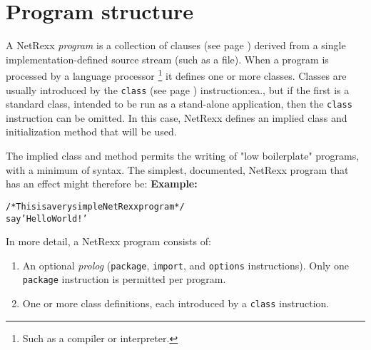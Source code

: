 \chapter{Program structure}\label{"id"}
 A NetRexx \emph{program} is a collection of
 clauses (see page \pageref{refclau})  derived from a single implementation-defined
source stream (such as a file).
When a program is processed by a language processor
\footnote{
Such as a compiler or interpreter.
}
it defines one or more classes.
Classes are usually introduced by the  \texttt{class} (see page \pageref{refclass}) 
instruction:ea., but if the first is a standard class, intended to be
run as a stand-alone application, then the \texttt{class} instruction
can be omitted.  In this case, NetRexx defines an implied class
and initialization method that will be used.
 
The implied class and method permits the writing of "low
boilerplate" programs, with a minimum of syntax.
The simplest, documented, NetRexx program that has an effect might
therefore be:
 \textbf{Example:}
\begin{alltt}
/* This is a very simple NetRexx program */
say 'Hello World!'
\end{alltt}
 
In more detail, a NetRexx program consists of:
\begin{enumerate}
\item An optional \emph{prolog} (\texttt{package}, \texttt{import}, and
\texttt{options} instructions).  Only one \texttt{package} instruction
is permitted per program.
\item  One or more class definitions, each introduced by a \texttt{class}
instruction.
\end{enumerate}
 

